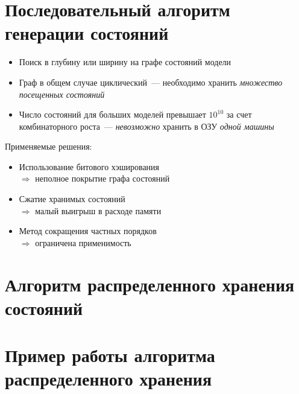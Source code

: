 \documentclass[12pt]{article}
\begin{document}
\section{Последовательный алгоритм генерации состояний}
\label{sec:seq-stategen}

\small{
  \begin{itemize}
  \item Поиск в глубину или ширину на графе состояний модели
  \item Граф в общем случае циклический~--- необходимо хранить \textit{множество посещенных состояний}
  \item Число состояний для больших моделей превышает $10^{10}$ за счет комбинаторного
    роста~--- \textit{невозможно} хранить в ОЗУ \textit{одной машины}
  \end{itemize}
  
  \begin{minipage}[t]{0.25\linewidth}
    \begin{flushright}
      Применяемые решения:
    \end{flushright}
  \end{minipage}
  \begin{minipage}[t]{0.7\linewidth}
    \begin{flushleft}
      \begin{itemize}
      \item Использование битового \mbox{хэширования} \\ $\Rightarrow$ неполное покрытие графа состояний
      \item Сжатие хранимых состояний \\ $\Rightarrow$ малый выигрыш в расходе памяти
      \item Метод сокращения частных порядков \\ $\Rightarrow$ ограничена применимость
      \end{itemize}
    \end{flushleft}
  \end{minipage}
}

\section{Алгоритм распределенного хранения состояний}
\label{sec:distr-storage}



\section{Пример работы алгоритма распределенного хранения}
\label{sec:distr-storage2}
\end{document}
